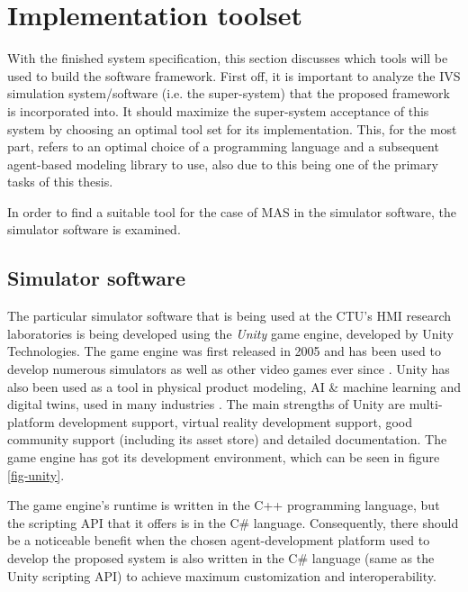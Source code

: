 \documentclass[0main.tex]{subfiles}
\begin{document}
\section{Implementation toolset}\label{sec-toolset}

With the finished system specification, this section discusses which tools will be used to build the software framework. 
First off, it is important to analyze the IVS simulation system/software (i.e. the super-system) that
the proposed framework is incorporated into. It should maximize the super-system acceptance of 
this system by choosing an optimal tool set for its implementation. This, for the most part,
refers to an optimal choice of a programming language and a subsequent agent-based modeling
library to use, also due to this being one of the primary tasks of this thesis. 

In order to find a suitable tool for the case of MAS in the simulator software, the simulator
software is examined.

\subsection{Simulator software}

The particular simulator software that is being used at the CTU's HMI research laboratories is being
developed using the \emph{Unity} game engine, developed by Unity Technologies. The game engine
was first released in 2005 and has been used to develop numerous simulators as well as other
video games ever since \cite{UnityTechnologies2022}. Unity has also been used as a tool in
physical product modeling, AI \& machine learning and digital twins, used in many industries
\cite{UnityTechnologies2022a}. The main strengths of Unity are multi-platform development
support, virtual reality development support, good community support (including its asset
store) and detailed documentation. The game engine has got its development environment, which 
can be seen in figure \ref{fig-unity}.

The game engine's runtime is written in the C++ programming language, but the scripting API
that it offers is in the C\# language. Consequently, there should be a noticeable benefit when the
chosen agent-development platform used to develop the proposed system is also written in the
C\# language (same as the Unity scripting API) to achieve maximum customization and
interoperability.
\end{document}
